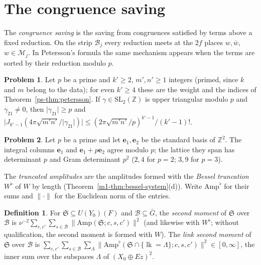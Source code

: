 \documentclass[reqno]{amsart}
\theoremstyle{definition}
\newtheorem{problem}{Problem}[section]
\newtheorem{definition}{Definition}[section]
\theoremstyle{plain}
\theoremstyle{remark}
\newcommand{\Z}{{\mathbb{Z}}}
\newcommand{\Bc}{\mathcal B}
\newcommand{\cMc}{\mathcal M}
\newcommand{\Gb}{\bar G}
\newcommand{\be}{\mathbf e}
\newcommand{\Sf}{\mathfrak S}
\newcommand{\Amp}{\mathrm{Amp}}
\newcommand{\lk}{\operatorname{lk}}
\begin{document}
\section{The congruence saving}\label{sec:gain}

The \emph{congruence saving} is the saving from congruences satisfied by terms above a fixed reduction.  On the strip \(\Bc_j\) every reduction meets at the \(2f\) places \(w,\bar w\), \(w\in\cMc_j\).  In Petersson's formula the same mechanism appears when the terms are sorted by their reduction modulo \(p\).

\begin{problem}\label{pr:petersson-gain}
Let \(p\) be a prime and \(k'\ge2\), \(m',n'\ge1\) integers (primed, since \(k\) and \(m\) belong to the data); for even \(k'\ge4\) these are the weight and the indices of Theorem~\ref{ps-thm:petersson}.  If \(\gamma\in\mathrm{SL}_2(\Z)\) is upper triangular modulo \(p\) and \(\gamma_{21}\ne0\), then \(\lvert\gamma_{21}\rvert\ge p\) and \(\lvert J_{k'-1}(4\pi\sqrt{m'n'}/\lvert\gamma_{21}\rvert)\rvert\le(2\pi\sqrt{m'n'}/p)^{k'-1}/(k'-1)!\).
\end{problem}

\begin{problem}\label{pr:columns}
Let \(p\) be a prime and let \(\be_1,\be_2\) be the standard basis of \(\Z^2\).  The integral columns \(\be_1\) and \(\be_1+p\be_2\) agree modulo \(p\); the lattice they span has determinant \(p\) and Gram determinant \(p^2\) (\(2,4\) for \(p=2\); \(3,9\) for \(p=3\)).
\end{problem}

The \emph{truncated amplitudes} are the amplitudes formed with the \emph{Bessel truncation} \(W^\flat\) of \(W\) by length (Theorem~\ref{m1-thm:bessel-system}(d)).  Write \(\Amp^\flat\) for their sums and \(\lVert\cdot\rVert\) for the Euclidean norm of the entries.

\begin{definition}\label{def:moments}
For \(\Sf\subseteq U(Y_0)(F)\) and \(\Bc\subseteq\Gb\), the \emph{second moment} of \(\Sf\) over \(\Bc\) is \(\nu^{-2}\sum_{c,c'}\sum_{s\in\Bc}\lVert\Amp(\Sf;c,s,c')\rVert^2\) (and likewise with \(W^\flat\); without qualification, the second moment is formed with \(W\)).  The \emph{link second moment} of \(\Sf\) over \(\Bc\) is \(\sum_{c,c'}\sum_{s\in\Bc}\sum_\Lambda\lVert\Amp^\flat(\Sf\cap\{\lk=\Lambda\};c,s,c')\rVert^2\in[0,\infty]\), the inner sum over the subspaces \(\Lambda\) of \((X_0\oplus Ez)^2\).
\end{definition}
\end{document}
